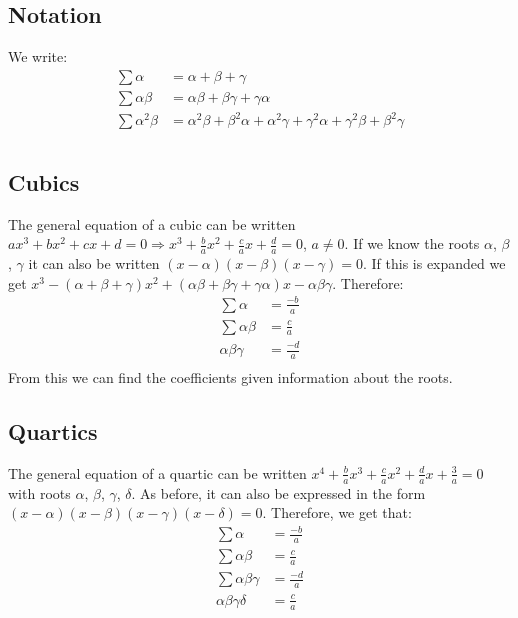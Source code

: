 \documentclass[a4paper,12pt]{article}
\begin{document}
\subsection*{Notation}
We write:
\begin{align*}
\sum \alpha & = \alpha + \beta + \gamma \\
\sum \alpha \beta & = \alpha \beta + \beta \gamma + \gamma \alpha \\
\sum \alpha^2 \beta & = \alpha^2 \beta + \beta^2 \alpha + \alpha^2 \gamma + \gamma^2 \alpha + \gamma^2 \beta + \beta^2 \gamma \\
\end{align*}
\subsection*{Cubics}
The general equation of a cubic can be written $ax^3 + bx^2 + cx + d = 0 \Rightarrow x^3 + \frac{b}{a}x^2 + \frac{c}{a}x + \frac{d}{a} = 0$, $a \neq 0$. If we know the roots $\alpha$, $\beta$, $\gamma$ it can also be written $(x-\alpha)(x-\beta)(x-\gamma)=0$. If this is expanded we get  $x^3 - (\alpha + \beta + \gamma)x^2 + (\alpha \beta + \beta \gamma + \gamma \alpha)x - \alpha \beta \gamma$. Therefore:
\begin{align*}
\sum \alpha & = \frac{-b}{a} \\
\sum \alpha \beta & = \frac{c}{a} \\
\alpha \beta \gamma & = \frac{-d}{a} \\
\end{align*}
From this we can find the coefficients given information about the roots. 

\subsection*{Quartics}
The general equation of a quartic can be written $x^4 + \frac{b}{a} x^3 + \frac{c}{a} x^2 + \frac{d}{a} x + \frac{3}{a} = 0$ with roots $\alpha$, $\beta$, $\gamma$, $\delta$. As before, it can also be expressed in the form $(x-\alpha)(x-\beta)(x-\gamma)(x-\delta)=0$. Therefore, we get that:
\begin{align*}
\sum \alpha & = \frac{-b}{a} \\
\sum \alpha \beta & = \frac{c}{a} \\
\sum \alpha \beta \gamma & = \frac{-d}{a} \\
\alpha \beta \gamma \delta & = \frac{c}{a} \\
\end{align*}
\end{document}
